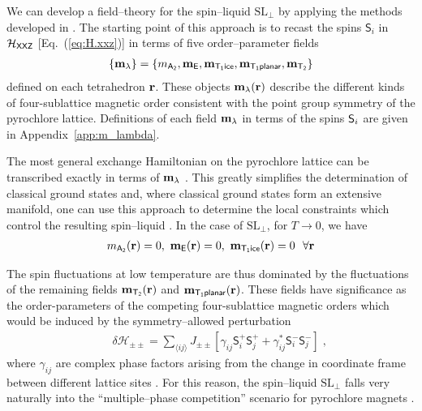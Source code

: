 \documentclass[apsrev4-1,prx,superscriptaddress,floatfix,twocolumn,longbibliography]{revtex4-1}
\begin{document}
We can develop a field--theory for the spin--liquid 
$\text{SL}_\perp$ by applying the 
methods developed in \cite{benton16-NatCommun7,owen-thesis}.    
%
The starting point of this approach is to recast the spins $\mathsf{S}_i$ 
in $\mathcal{H}_{\sf XXZ} $ [Eq.~(\ref{eq:H.xxz})] in terms of five 
order--parameter fields 
%
\begin{eqnarray}
\{ {\bf m}_{\lambda} \} 
=
\{
m_{\sf A_2}, {\bf m}_{\sf E} ,
{\bf m}_{\sf T_1 ice}, 
{\bf m}_{\sf T_1 planar} ,
{\bf m}_{\sf T_2}
\}
\label{eq:irreps}
\end{eqnarray}
%
defined on each tetrahedron ${\bf r}$.
%
These objects ${\bf m}_{\lambda}(\mathbf{r})$ describe the different
kinds of four-sublattice magnetic order consistent with the point
group symmetry of the pyrochlore lattice.
%
Definitions of each field ${\bf m}_{\lambda}$
in terms of the spins ${\sf S}_i$ are given in Appendix~\ref{app:m_lambda}.


The most general exchange Hamiltonian on the pyrochlore lattice 
can be transcribed exactly in terms of ${\bf m}_{\lambda}$ \cite{yan17}.
%
This greatly simplifies the determination of classical ground states and, 
where classical ground states form an extensive manifold, one can use this 
approach to determine the local constraints which control the resulting 
spin--liquid \cite{benton16-NatCommun7,owen-thesis}.
%
In the case of $\text{SL}_\perp$, for $T \to 0$, we have
\begin{eqnarray}
{m}_{\sf A_2}({\bf r})=0, \
{\bf m}_{\sf E}({\bf r})=0, \
{\bf m}_{\sf T_1 ice}({\bf r})=0 \ \ \forall {\bf r}
\label{eq:SLIIconstraints}
\end{eqnarray}


The spin fluctuations at low temperature are thus dominated
by the fluctuations of the remaining fields ${\bf m}_{\sf T_2}({\bf r})$
and ${\bf m}_{\sf T_1 planar}({\bf r})$.
%
These fields have significance as the order-parameters of the
competing four-sublattice magnetic orders which would be induced
by the symmetry--allowed perturbation 
%
\begin{eqnarray}
&&\delta\mathcal{H}_{\pm\pm}=\sum_{\langle ij\rangle} 
J_{\pm\pm} \left[\gamma_{ij} \mathsf{S}_i^+ \mathsf{S}_j^+ + \gamma_{ij}^*
                 \mathsf{S}_i^-\mathsf{S}_j^-\right] \; ,
\label{eq:Hpmpm}
\end{eqnarray}
%
where $\gamma_{ij}$ are complex phase factors 
arising from the change in coordinate 
frame between different lattice sites  
\cite{curnoe07,mcclarty09,onoda11, Onoda2010, Onoda2011a, ross11-PRX1}.   
%
For this reason, the spin--liquid $\text{SL}_\perp$ falls very naturally into 
the ``multiple--phase competition'' scenario for pyrochlore magnets 
\cite{yan-arXiv,jaubert15,owen-thesis,yan17}.   
\end{document}
